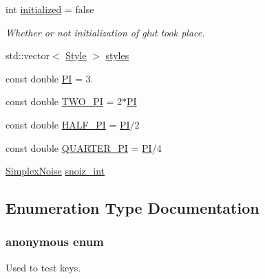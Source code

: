 \begin{DoxyCompactItemize}
\item 
int \hyperlink{namespacecprocessing_abe1272b16cf18357f89ae10c184fbcd2}{initialized} = false
\begin{DoxyCompactList}\small\item\em \-Whether or not initialization of glut took place. \end{DoxyCompactList}\item 
std\-::vector$<$ \hyperlink{classcprocessing_1_1Style}{\-Style} $>$ \hyperlink{namespacecprocessing_a58f7198a2386df8ea3559ea578069388}{styles}
\item 
const double \hyperlink{namespacecprocessing_a445521f2b665e4744680faa4a6806676}{\-P\-I} = 3.
\item 
const double \hyperlink{namespacecprocessing_aa9c16baaa88d39db100f54cb0bbca62f}{\-T\-W\-O\-\_\-\-P\-I} = 2$\ast$\hyperlink{namespacecprocessing_a445521f2b665e4744680faa4a6806676}{\-P\-I}
\item 
const double \hyperlink{namespacecprocessing_a257bee644c97e92e9f9492c569ab863d}{\-H\-A\-L\-F\-\_\-\-P\-I} = \hyperlink{namespacecprocessing_a445521f2b665e4744680faa4a6806676}{\-P\-I}/2
\item 
const double \hyperlink{namespacecprocessing_aa4fa2ff3538b68df8b95c6eba6c33a28}{\-Q\-U\-A\-R\-T\-E\-R\-\_\-\-P\-I} = \hyperlink{namespacecprocessing_a445521f2b665e4744680faa4a6806676}{\-P\-I}/4
\item 
\hyperlink{classcprocessing_1_1SimplexNoise}{\-Simplex\-Noise} \hyperlink{namespacecprocessing_aab81f757257f375ea414cd3a49483e4c}{snoiz\-\_\-int}
\end{DoxyCompactItemize}


\subsection{\-Enumeration \-Type \-Documentation}
\hypertarget{namespacecprocessing_accea6f128c16246ebc5d97249bef2798}{\subsubsection[{anonymous enum}]{\setlength{\rightskip}{0pt plus 5cm}anonymous enum}}\label{namespacecprocessing_accea6f128c16246ebc5d97249bef2798}


\-Used to test keys. 


